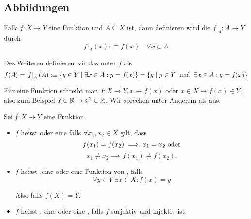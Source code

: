 \subsection{Abbildungen}

\begin{mydef}
  Falls $f:X \to Y$ eine Funktion und $A\subseteq X$ ist, dann definieren wird die  $\left. f \right | _{A} : A \to Y$ durch
  \begin{equation}
    \left. f \right | _{A} (x) :\equiv f(x)  \quad \forall x \in A
  \end{equation}

  Des Weiteren definieren wir das  unter $f$ als
  \begin{equation}
    f(A) = \left. f \right |_{A}(A) :\equiv \{y \in Y \mid \exists x \in A : y=f(x) \} = \{y \mid y \in Y \;\; \text{und}\;\; \exists x \in A : y=f(x) \}
  \end{equation}
\end{mydef}

Für eine Funktion schreibt man $f: X \to Y, x \mapsto f(x)$ oder $x \in X \mapsto f(x) \in Y$, also zum Beispiel $x \in \mathbb{R} \mapsto x^2 \in \mathbb{R}$. Wir sprechen \qt{$\mapsto$} unter Anderem als  aus.

\begin{mydef}
  Sei $f: X \to Y$ eine Funktion.
  \begin{itemize}
    \item $f$ heisst  oder eine  falls $\forall x_1, x_2 \in X$ gilt, dass
    \begin{equation}
      f(x_1) = f(x_2) \implies x_1 = x_2 $ oder$
    \end{equation}
    \begin{equation}
      x_1 \neq x_2 \implies f(x_1) \neq f(x_2).
    \end{equation}

    \item $f$ heisst ,eine  oder eine Funktion von , falls
    \begin{equation}
      \forall y \in Y \; \exists x \in X: f(x) = y
    \end{equation}

    Also falls $f(X) = Y$.

    \item $f$ heisst , eine  oder eine , falls $f$ surjektiv und injektiv ist.
  \end{itemize}
\end{mydef}

